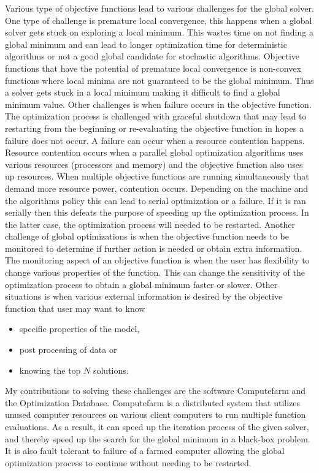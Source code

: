 Various type of objective functions lead to various challenges for the global solver. One type of challenge is premature local convergence, this happens when a global solver gets stuck on exploring a local minimum. This wastes time on not finding a global minimum and can lead to longer optimization time for deterministic algorithms or not a good global candidate for stochastic algorithms. Objective functions that have the potential of premature local convergence is
non-convex functions where local minima are not guaranteed to be the global minimum. Thus a solver gets stuck in a local minimum making it difficult to find a global minimum value. Other challenges is when failure occurs in the objective function. The optimization process is challenged with graceful shutdown that may lead to  restarting from the beginning or re-evaluating the objective function in hopes a failure does not occur. A failure can occur when a
resource contention happens. Resource contention occurs when a parallel global optimization algorithms uses various resources (processors and memory) and the objective function also uses up resources. When multiple objective functions are running simultaneously that demand more resource power, contention occurs. Depending on the machine and the algorithms policy this can lead to serial optimization or a failure. If it is ran serially then this defeats the purpose of
speeding up the optimization process. In the latter case, the optimization process will needed to be restarted. Another challenge of global optimizations is when the objective function needs to be monitored to determine if further action is needed or obtain extra information. The monitoring aspect of an objective function is when the user has flexibility to change various properties of the function. This can change the sensitivity of the optimization process to
obtain a global minimum faster or slower. Other situations is when various external information is desired by the objective function that user may want to know
\begin{itemize}
  \item specific properties of the model, 
  \item post processing of data or
  \item knowing the top $N$ solutions.
\end{itemize}

My contributions to solving these challenges are the software Computefarm and the Optimization Database. Computefarm is a distributed system that utilizes unused computer resources on various client computers to run multiple function evaluations. As a result, it can speed up the iteration process of the given solver, and thereby speed up the search for the global
minimum in a black-box problem. It is also fault tolerant to failure of a farmed computer allowing the global optimization process to continue without needing to be restarted. 

